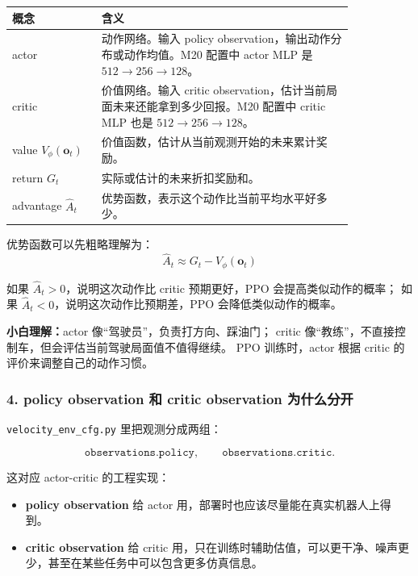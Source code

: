 \documentclass[UTF8,11pt,a4paper]{ctexart}
\newcommand{\bs}[1]{\bm{#1}}
\begin{document}
\begin{center}
\renewcommand{\arraystretch}{1.25}
\begin{tabular}{p{0.22\linewidth}p{0.62\linewidth}}
\toprule
\textbf{概念} & \textbf{含义}\\
\midrule
actor & 动作网络。输入 policy observation，输出动作分布或动作均值。M20 配置中 actor MLP 是 \(512\rightarrow256\rightarrow128\)。\\
critic & 价值网络。输入 critic observation，估计当前局面未来还能拿到多少回报。M20 配置中 critic MLP 也是 \(512\rightarrow256\rightarrow128\)。\\
value \(V_\phi(\bs o_t)\) & 价值函数，估计从当前观测开始的未来累计奖励。\\
return \(G_t\) & 实际或估计的未来折扣奖励和。\\
advantage \(\hat A_t\) & 优势函数，表示这个动作比当前平均水平好多少。\\
\bottomrule
\end{tabular}
\end{center}

优势函数可以先粗略理解为：
\[
\boxed{
\hat A_t
\approx
G_t - V_\phi(\bs o_t)
}
\]

如果 \(\hat A_t>0\)，说明这次动作比 critic 预期更好，PPO 会提高类似动作的概率；
如果 \(\hat A_t<0\)，说明这次动作比预期差，PPO 会降低类似动作的概率。

\begin{answerbox}
\textbf{小白理解：}actor 像“驾驶员”，负责打方向、踩油门；
critic 像“教练”，不直接控制车，但会评估当前驾驶局面值不值得继续。
PPO 训练时，actor 根据 critic 的评价来调整自己的动作习惯。
\end{answerbox}

\subsubsection{4. policy observation 和 critic observation 为什么分开}

\texttt{velocity\_env\_cfg.py} 里把观测分成两组：

\[
\texttt{observations.policy},
\qquad
\texttt{observations.critic}.
\]

这对应 actor-critic 的工程实现：

\begin{itemize}
  \item \textbf{policy observation} 给 actor 用，部署时也应该尽量能在真实机器人上得到。
  \item \textbf{critic observation} 给 critic 用，只在训练时辅助估值，可以更干净、噪声更少，甚至在某些任务中可以包含更多仿真信息。
\end{itemize}
\end{document}
